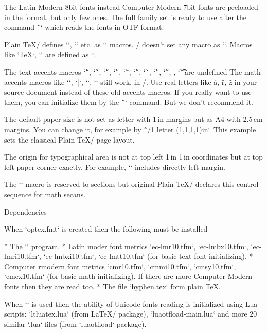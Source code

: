 {\new
The Latin Modern 8bit fonts instead Computer Modern 7bit fonts are
preloaded in the format, but only few ones. The full family set is ready to
use after the command \~`\fontfam[LMfonts]` which reads the fonts in OTF
format.

\new
Plain \TeX/ defines `\newcount`, `\bye` etc. as `\outer` macros. \OpTeX/
doesn't set any macro as `\outer`. Macros like `\TeX`, `\rm` are defined as
`\protected`.

\new
The text accents macros `\"`, `\'`, `\v`, `\u`, `\=`, `\^`, `\.`, `\H`,
`\~`, , `\t`   are undefined\fnote 
{The math accents macros like `\acute`, `\bar`, `\dot`, `\hat` still work.}
in \OpTeX/. Use real
letters like á, ř, ž in your source document instead of these old accents macros.
If you really want to use them, you can initialize them by the \^`\oldaccents`
command. But we don't recommend it.

\new
The default paper size is not set as letter with 1\,in margins but as A4 with
2.5\,cm margins. You can change it, for example by 
\^`\margins/1 letter (1,1,1,1)in`. This example sets the classical Plain \TeX/
page layout.

\new
The origin for typographical area is not at top left 1\,in 1\,in coordinates
but at top left paper corner exactly. For example, `\hoffset` includes directly left
margin.

The `\sec` macro is reserved to sections but original Plain \TeX/ declares this
control sequence for math secans.

\enddocument



\sec Dependencies

When `optex.fmt` is created then the following must be installed

\begitems
* The `\luatex` program.
* Latin moder font metrics 
  `ec-lmr10.tfm`, `ec-lmbx10.tfm`, `ec-lmri10.tfm`,
  `ec-lmbxi10.tfm`, `ec-lmtt10.tfm` (for basic text font initializing).
* Computer rmodern font metrics
  `cmr10.tfm`, `cmmi10.tfm`, `cmsy10.tfm`, `cmex10.tfm` (for basic math
  initializing). If there are more Computer Modern fonts then they are read
  too.
* The file `hyphen.tex` form plain \TeX.
\enditems

When `\fontfam` is used  then the ability of Unicode fonts reading 
is initialized using Lua scripts: `ltluatex.lua` (from \LaTeX/ package), 
`luaotfload-main.lua` and more 20 similar `.lua` files (from `luaotfload`
package).

}
